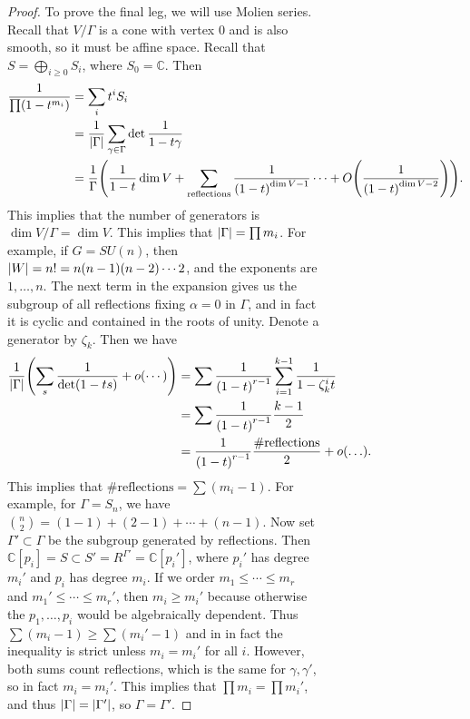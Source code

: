 \documentclass[leqno, openany]{memoir}
\theoremstyle{definition}
\theoremstyle{remark}
\theoremstyle{plain}
\theoremstyle{definition}
\theoremstyle{remark}
\newcommand{\C}{\mathbb{C}}
\begin{document}
\begin{figure}[H]
\begin{figure}[H]
\begin{proof}
    To prove the final leg, we will use Molien series. Recall that $V/{\Gamma}$
    is a cone with vertex $0$ and is also smooth, so it must be affine space.
    Recall that $S = \bigoplus_{i \geq 0} S_i$, where $S_0 = \C$. Then
    \begin{align*} \frac{1}{\prod(1-t^{m_i})} &= \sum_i t^i S_i \\ &=
        \frac{1}{\abs{\Gamma}} \sum_{\gamma \in \Gamma} \det \frac{1}{1- t
        \gamma} \\ &= \frac{1}{\Gamma} \qty(\frac{1}{1-t} \dim V +
        \sum_{\text{reflections}} \frac{1}{{(1-t)}^{\dim V - 1}} \cdots +
        O\qty(\frac{1}{{(1-t)}^{\dim V - 2}})).  \end{align*} This implies that
        the number of generators is $\dim V/\Gamma = \dim V$. This implies that
        $\abs{\Gamma} = \prod m_i$. For example, if $G = SU(n)$, then $\abs{W}
        = n! = n(n-1)(n-2) \cdots 2$, and the exponents are $1, \ldots, n$. The
        next term in the expansion gives us the subgroup of all reflections
        fixing $\alpha = 0$ in $\Gamma$, and in fact it is cyclic and contained
        in the roots of unity. Denote a generator by $\zeta_k$. Then we have
        \begin{align*} \frac{1}{\abs{\Gamma}} \qty( \sum_s \frac{1}{\det(1-ts)}
            + o(\cdots) ) &= \sum \frac{1}{{(1-t)}^{r-1}} \sum_{i=1}^{k-1}
            \frac{1}{1-\zeta_k^i t} \\ &= \sum \frac{1}{{(1-t)}^{r-1}}
        \frac{k-1}{2} \\ &= \frac{1}{{(1-t)}^{r-1}} \frac{\#
    \text{reflections}}{2} + o(\ldots).  \end{align*} This implies that $\#
    \text{reflections} = \sum (m_i - 1)$. For example, for $\Gamma = S_n$, we
    have $\binom{n}{2} = (1-1) + (2-1) + \cdots + (n-1)$. Now set $\Gamma'
    \subset \Gamma$ be the subgroup generated by reflections. Then $\C[p_i] = S
    \subset S' = R^{\Gamma'} = \C[p_i']$, where $p_i'$ has degree $m_i'$ and
    $p_i$ has degree $m_i$. If we order $m_1 \leq \cdots \leq m_r$ and $m_1'
    \leq \cdots \leq m_r'$, then $m_i \geq m_i'$ because otherwise the $p_1,
    \ldots, p_i$ would be algebraically dependent. Thus $\sum (m_i - 1) \geq
    \sum (m_i' - 1)$ and in in fact the inequality is strict unless $m_i =
    m_i'$ for all $i$. However, both sums count reflections, which is the same
    for $\gamma, \gamma'$, so in fact $m_i = m_i'$. This implies that $\prod
    m_i = \prod m_i'$, and thus $\abs{\Gamma} = \abs{\Gamma'}$, so $\Gamma =
    \Gamma'$.  \end{proof}


\end{figure}
\end{figure}
\end{document}
